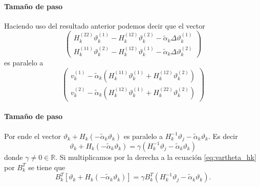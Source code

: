 \begin{frame}{\insertsectionhead}
    \framesubtitle{Tamaño de paso}
    Haciendo uso del resultado anterior podemos decir que el vector
    \begin{equation*}
        \begin{pmatrix}
            H_k^{(22)}\vartheta_k^{(1)}-H_k^{(12)}\vartheta_k^{(2)}-\tilde{\alpha}_k\Delta\vartheta_k^{(1)} \\[0.25cm]
            H_k^{(11)}\vartheta_k^{(2)}-H_k^{(12)}\vartheta_k^{(1)}-\tilde{\alpha}_k\Delta\vartheta_k^{(2)}
        \end{pmatrix}
    \end{equation*}
    es paralelo a
    \begin{equation*}
        \begin{pmatrix}
            v_k^{(1)} - \tilde{\alpha}_k(H_k^{(11)}\vartheta_k^{(1)}+H_k^{(12)}\vartheta_k^{(2)}) \\[0.25cm]
            v_k^{(2)} - \tilde{\alpha}_k(H_k^{(12)}\vartheta_k^{(1)}+H_k^{(22)}\vartheta_k^{(2)})
        \end{pmatrix}
    \end{equation*}
\end{frame}

\begin{frame}{\insertsectionhead}
    \framesubtitle{Tamaño de paso}
    Por ende el vector $\vartheta_k+H_k(-\tilde{\alpha}_k\vartheta_k)$ es paralelo a  $H_k^{-1}\vartheta_j-\tilde{\alpha}_k\vartheta_k$. Es decir
    \begin{equation}
        \vartheta_k+H_k(-\tilde{\alpha}_k\vartheta_k) = \gamma(H_k^{-1}\vartheta_j-\tilde{\alpha}_k\vartheta_k) \label{eq:vartheta_hk}
    \end{equation}
    donde $\gamma\neq 0  \in \mathbb{R}$. Si multiplicamos por la derecha a la ecuación \ref{eq:vartheta_hk} por $B_k^T$ se tiene que
    \begin{equation*}
        B_k^T[\vartheta_k+H_k(-\tilde{\alpha}_k\vartheta_k)] = \gamma B_k^T(H_k^{-1}\vartheta_j-\tilde{\alpha}_k\vartheta_k).
    \end{equation*}
\end{frame}

